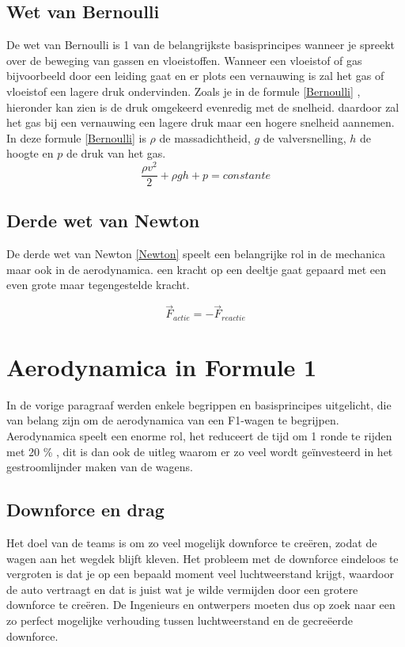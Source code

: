 \documentclass[a4paper,kulak]{kulakarticle} %
\begin{document}
\subsection{Wet van Bernoulli}

De wet van Bernoulli is 1 van de belangrijkste basisprincipes wanneer je spreekt over  de beweging van gassen en vloeistoffen. Wanneer een vloeistof of gas bijvoorbeeld door een leiding gaat en er plots een vernauwing is zal het gas of vloeistof een lagere druk ondervinden. Zoals je in de formule \ref{Bernoulli} , hieronder kan zien is de druk omgekeerd evenredig met de snelheid. daardoor zal het gas bij een vernauwing een lagere druk maar een hogere snelheid aannemen. In deze formule \ref{Bernoulli} is $\rho $ de massadichtheid, $g $ de valversnelling, $h $ de hoogte en $p $ de druk van het gas.
\\

\begin{equation}
\frac{ \rho v^2}{2}  + \rho gh + p = constante
\label{Bernoulli}
\end{equation}

\subsection{Derde wet van Newton}
De derde wet van Newton  \ref{Newton} speelt een belangrijke rol in de mechanica maar ook in de aerodynamica. een kracht op een deeltje gaat gepaard met een even grote maar tegengestelde kracht. 	\cite{houghton2003aerodynamics}

\begin{equation}
\vec{F}_{actie} = - \vec{F}_{reactie}
\label{Newton}	
\end{equation}

\section{Aerodynamica in Formule 1}
In de vorige paragraaf werden enkele begrippen en basisprincipes uitgelicht, die van belang zijn om de aerodynamica van een F1-wagen te begrijpen. Aerodynamica speelt een enorme rol, het reduceert de tijd om 1 ronde te rijden met 20 \% , dit is dan ook de uitleg waarom er zo veel wordt geïnvesteerd in het gestroomlijnder maken van de wagens. \cite{toet2013aerodynamics} \cite{zhang2004vortices}

\subsection{Downforce en drag} 
Het doel van de teams is om zo veel mogelijk downforce te creëren, zodat de wagen aan het wegdek blijft kleven. Het probleem met de downforce eindeloos te vergroten is dat je op een bepaald moment veel luchtweerstand krijgt, waardoor de auto vertraagt en dat is juist wat je wilde vermijden door een grotere downforce te creëren. De Ingenieurs en ontwerpers moeten dus op zoek naar een zo perfect mogelijke verhouding tussen luchtweerstand en de gecreëerde downforce.
\end{document}
